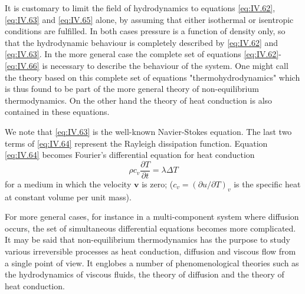 It is customary to limit the field of hydrodynamics to equations \eqref{eq:IV.62}, \eqref{eq:IV.63} and \eqref{eq:IV.65} alone, by assuming that either isothermal or isentropic conditions are fulfilled. In both cases pressure is a function of density only, so that the hydrodynamic behaviour is completely described by \eqref{eq:IV.62} and \eqref{eq:IV.63}. In the more general case the complete set of equations \eqref{eq:IV.62}-\eqref{eq:IV.66} is necessary to describe the behaviour of the system. One might call the theory based on this complete set of equations "thermohydrodynamics" which is thus found to be part of the more general theory of non-equilibrium thermodynamics. On the other hand the theory of heat conduction is also contained in these equations.

We note that \eqref{eq:IV.63} is the well-known Navier-Stokes equation. The last two terms of \eqref{eq:IV.64} represent the Rayleigh dissipation function. Equation \eqref{eq:IV.64} becomes Fourier's differential equation for heat conduction
\begin{equation}
\rho c_v \frac{\partial T}{\partial t} = \lambda \Delta T
    \label{eq:IV.67}
\end{equation}
for a medium in which the velocity $\bm{v}$ is zero; ($c_v = (\partial u / \partial T)_v$ is the specific heat at constant volume per unit mass).

For more general cases, for instance in a multi-component system where diffusion occurs, the set of simultaneous differential equations becomes more complicated. It may be said that non-equilibrium thermodynamics has the purpose to study various irreversible processes as heat conduction, diffusion and viscous flow from a single point of view. It englobes a number of phenomenological theories such as the hydrodynamics of viscous fluids, the theory of diffusion and the theory of heat conduction.
